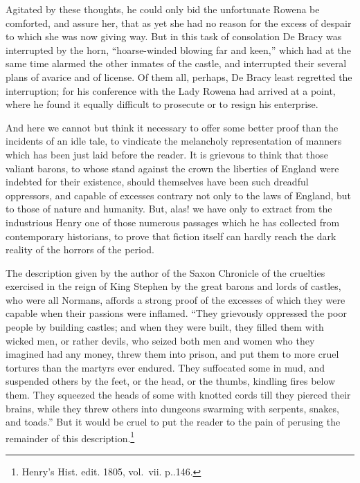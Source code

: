 Agitated by these thoughts, he could only bid the unfortunate Rowena be
comforted, and assure her, that as yet she had no reason for the excess
of despair to which she was now giving way. But in this task of
consolation De Bracy was interrupted by the horn, ``hoarse-winded
blowing far and keen,'' which had at the same time alarmed the other
inmates of the castle, and interrupted their several plans of avarice
and of license. Of them all, perhaps, De Bracy least regretted the
interruption; for his conference with the Lady Rowena had arrived at a
point, where he found it equally difficult to prosecute or to resign his
enterprise.

And here we cannot but think it necessary to offer some better proof
than the incidents of an idle tale, to vindicate the melancholy
representation of manners which has been just laid before the reader. It
is grievous to think that those valiant barons, to whose stand against
the crown the liberties of England were indebted for their existence,
should themselves have been such dreadful oppressors, and capable of
excesses contrary not only to the laws of England, but to those of
nature and humanity. But, alas! we have only to extract from the
industrious Henry one of those numerous passages which he has collected
from contemporary historians, to prove that fiction itself can hardly
reach the dark reality of the horrors of the period.

The description given by the author of the Saxon Chronicle of the
cruelties exercised in the reign of King Stephen by the great barons and
lords of castles, who were all Normans, affords a strong proof of the
excesses of which they were capable when their passions were inflamed.
``They grievously oppressed the poor people by building castles; and
when they were built, they filled them with wicked men, or rather
devils, who seized both men and women who they imagined had any money,
threw them into prison, and put them to more cruel tortures than the
martyrs ever endured. They suffocated some in mud, and suspended others
by the feet, or the head, or the thumbs, kindling fires below them. They
squeezed the heads of some with knotted cords till they pierced their
brains, while they threw others into dungeons swarming with serpents,
snakes, and toads.'' But it would be cruel to put the reader to the pain
of perusing the remainder of this description.\footnote{Henry's Hist.
edit. 1805, vol.~vii. p..146.}

